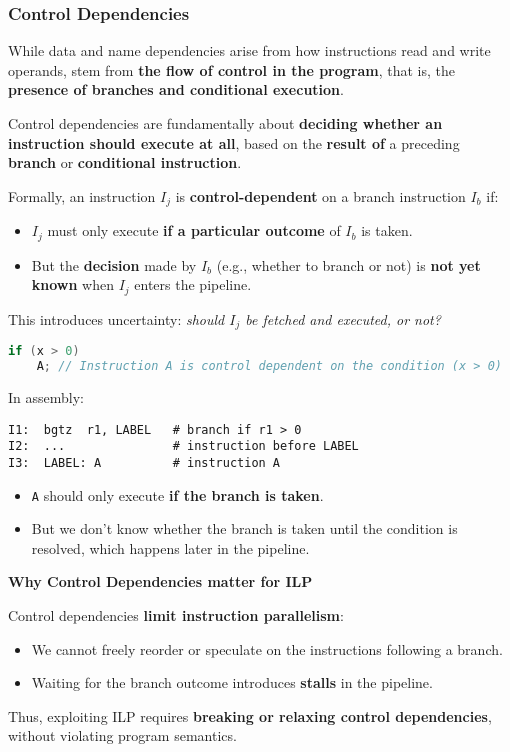 \subsubsection{Control Dependencies}

While data and name dependencies arise from how instructions read and write operands,  stem from \textbf{the flow of control in the program}, that is, the \textbf{presence of branches and conditional execution}.

\highspace
Control dependencies are fundamentally about \textbf{deciding whether an instruction should execute at all}, based on the \textbf{result of} a preceding \textbf{branch} or \textbf{conditional instruction}.

\highspace
Formally, an instruction $I_{j}$ is \textbf{control-dependent} on a branch instruction $I_{b}$ if:
\begin{itemize}
    \item $I_{j}$ must only execute \textbf{if a particular outcome} of $I_{b}$ is taken.
    \item But the \textbf{decision} made by $I_{b}$ (e.g., whether to branch or not) is \textbf{not yet known} when $I_{j}$ enters the pipeline.
\end{itemize}
This introduces uncertainty: \emph{should $I_{j}$ be fetched and executed, or not?}

\highspace
\begin{examplebox}
    \begin{lstlisting}[language=c]
if (x > 0)
    A; // Instruction A is control dependent on the condition (x > 0)\end{lstlisting}
    In assembly:
    \begin{lstlisting}[language=riscv, mathescape=true]
I1:  bgtz  r1, LABEL   # branch if r1 > 0
I2:  ...               # instruction before LABEL
I3:  LABEL: A          # instruction A\end{lstlisting}
    \begin{itemize}
        \item \texttt{A} should only execute \textbf{if the branch is taken}.
        \item But we don't know whether the branch is taken until the condition is resolved, which happens later in the pipeline.
    \end{itemize}
\end{examplebox}

\highspace
\begin{flushleft}
    \textcolor{Red2}{ \textbf{Why Control Dependencies matter for ILP}}
\end{flushleft}
Control dependencies \textbf{limit instruction parallelism}:
\begin{itemize}
    \item We cannot freely reorder or speculate on the instructions following a branch.
    \item Waiting for the branch outcome introduces \textbf{stalls} in the pipeline.
\end{itemize}
Thus, exploiting ILP requires \textbf{breaking or relaxing control dependencies}, without violating program semantics.


